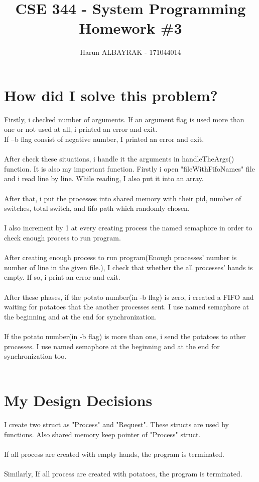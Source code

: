 \documentclass[20pt]{article}
\begin{document}
\title{%
  CSE 344 - System Programming \\
  \large Homework \#3}

\author{Harun ALBAYRAK - 171044014}

\maketitle

\Large
\section{How did I solve this problem?}
Firstly, i checked number of arguments. If an argument flag is used more than one or not used at all, i printed an error and exit. \\
If –b flag consist of negative number, I printed an error and exit. 
\\\\
After check these situations, i handle it the arguments in handleTheArgs() function.  It is also my important function. Firstly i open "fileWithFifoNames" file and i read line by line. While reading, I also put it into an array. 
\\\\
After that, i put the processes into shared memory with their pid, number of switches, total switch, and fifo path which randomly chosen. 
\\\\
I also increment by 1 at every creating process the named semaphore in order to check enough process to run program.
\\\\
After creating enough process to run program(Enough processes' number is number of line in the given file.), I check that whether the all processes' hands is empty. If so, i print an error and exit.
\\\\
After these phases, if the potato number(in -b flag) is zero, i created a FIFO and waiting for potatoes that the another processes sent. I use named semaphore at the beginning and at the end for synchronization. 
\\\\
If the potato number(in -b flag) is more than one, i send the potatoes to other processes. I use named semaphore at the beginning and at the end for synchronization too.  
\\\\
\section{My Design Decisions}
I create two struct as "Process" and "Request". These structs are used by functions. Also shared memory keep pointer of "Process" struct.
\\\\
If all process are created with empty hands, the program is terminated.
\\\\
Similarly, If all process are created with potatoes, the program is terminated. ​
\\\\
\end{document}
